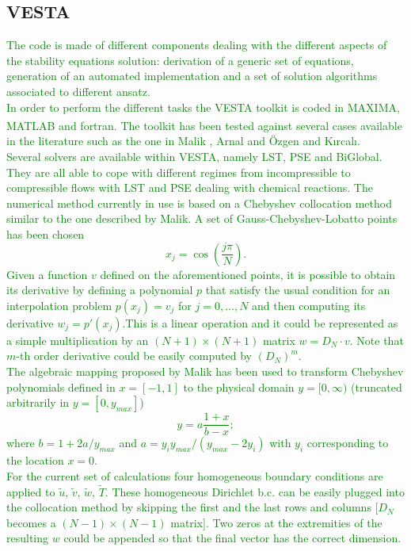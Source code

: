 \documentclass[]{aiaa-tc}%
\begin{document}
\subsection{VESTA}
\textcolor{green}{The code is made of different components dealing with the different aspects of the stability equations solution: derivation of a generic set of equations, generation of an automated implementation and a set of solution algorithms associated to different ansatz.\\
In order to perform the different tasks the VESTA toolkit is coded in MAXIMA, MATLAB\textsuperscript{\textregistered} and fortran. 
The toolkit has been tested against several cases available in the literature such as the one in Malik \cite{Malik:1990}, Arnal \cite{Arnal:agard1994} and \"{O}zgen and K{\i}rcal{\i}\cite{Ozgen_Kircali:2008}.\\
Several solvers are available within VESTA, namely LST, PSE and BiGlobal. They are all able to cope with different regimes from incompressible to compressible flows with LST and PSE dealing with chemical reactions. The numerical method currently in use is based on a Chebyshev collocation method similar to the one described by Malik\cite{Malik:1990}. A set of Gauss-Chebyshev-Lobatto points has been chosen
\begin{equation}
x_j=\cos\left( \frac{j \pi}{N}\right).
\end{equation}
Given a function $v$ defined on the aforementioned points,  it is possible to obtain its derivative by defining a polynomial $p$ that satisfy the usual condition for an interpolation problem $p(x_j)= v_j$ for $j=0,\ldots,N$ and then computing its derivative $w_j = p'(x_j)$.This is a linear operation and it could be represented as a simple multiplication by an $(N+1)\times(N+1)$ matrix $w = D_N	\cdot v$. Note that $m$-th order derivative could be easily computed by $\left(D_N\right)^m$.\\
The algebraic mapping proposed by Malik \cite{Malik:1990} has been used to transform Chebyshev polynomials defined in $x=[-1,1]$ to the physical domain $y=[0, \infty)$ (truncated arbitrarily in $y=[0, y_{max}]$)
\begin{equation}
 y = a \frac{1 + x}{b - x};
\end{equation}
where $b= 1 +2a/y_{max}$ and $a=y_i y_{max}/(y_{max}-2y_i)$ with $y_i$ corresponding to the location $x=0$.\\
For the current set of calculations four homogeneous boundary conditions are applied to $\tilde{u}$, $\tilde{v}$, $\tilde{w}$, $\tilde{T}$. These homogeneous Dirichlet b.c. can be easily plugged into the collocation method by skipping the first and the last rows and columns [$D_N$ becomes a $(N-1)\times(N-1)$ matrix]. Two zeros at the extremities of the resulting $w$ could be appended so that the final vector has the correct dimension.\\
}
\end{document}
